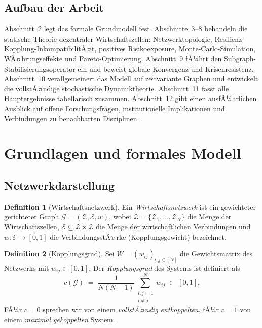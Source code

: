 ﻿\documentclass[a4paper,12pt]{article}
\theoremstyle{definition}
\newtheorem{definition}{Definition}
\begin{document}
\subsection{Aufbau der Arbeit}

Abschnitt~2 legt das formale Grundmodell fest. Abschnitte~3--8 behandeln die statische
Theorie dezentraler Wirtschaftszellen: Netzwerktopologie, Resilienz-Kopplung-InkompatibilitÃ¤t,
positives Risikoexposure, Monte-Carlo-Simulation, WÃ¤hrungseffekte und Pareto-Optimierung.
Abschnitt~9 fÃ¼hrt den Subgraph-Stabilisierungsoperator ein und beweist globale Konvergenz
und Krisenresistenz. Abschnitt~10 verallgemeinert das Modell auf zeitvariante Graphen und
entwickelt die vollstÃ¤ndige stochastische Dynamiktheorie. Abschnitt~11 fasst alle
Hauptergebnisse tabellarisch zusammen. Abschnitt~12 gibt einen ausfÃ¼hrlichen Ausblick auf
offene Forschungsfragen, institutionelle Implikationen und Verbindungen zu benachbarten
Disziplinen.

\section{Grundlagen und formales Modell}

\subsection{Netzwerkdarstellung}

\begin{definition}[Wirtschaftsnetzwerk]
    Ein \emph{Wirtschaftsnetzwerk} ist ein gewichteter gerichteter Graph
    $\mathcal{G} = (\mathcal{Z}, \mathcal{E}, w)$, wobei
    $\mathcal{Z} = \{\mathcal{Z}_1, \ldots, \mathcal{Z}_N\}$ die Menge der Wirtschaftszellen,
    $\mathcal{E} \subseteq \mathcal{Z} \times \mathcal{Z}$ die Menge der wirtschaftlichen
    Verbindungen und $w : \mathcal{E} \to [0,1]$ die VerbindungsstÃ¤rke (Kopplungsgewicht)
    bezeichnet.
\end{definition}

\begin{definition}[Kopplungsgrad]
\label{def:kopplungsgrad}
    Sei $W = (w_{ij})_{i,j \in [N]}$ die Gewichtsmatrix des Netzwerks mit $w_{ij} \in [0,1]$.
    Der \emph{Kopplungsgrad} des Systems ist definiert als
    \[
        c(\mathcal{G}) \;=\; \frac{1}{N(N-1)} \sum_{\substack{i,j=1\\i\neq j}}^{N} w_{ij}
        \;\in\; [0,1].
    \]
    FÃ¼r $c = 0$ sprechen wir von einem \emph{vollstÃ¤ndig entkoppelten}, fÃ¼r $c = 1$ von einem
    \emph{maximal gekoppelten} System.
\end{definition}
\end{document}
